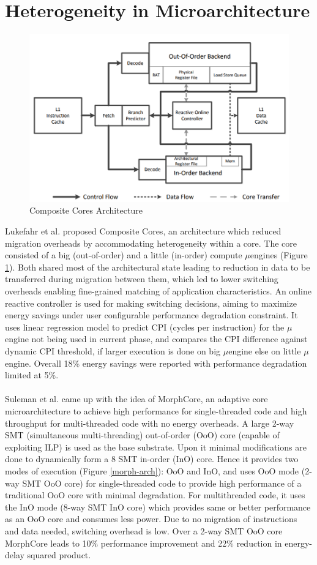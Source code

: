 \documentclass[a4paper,12pt, final]{report}
\begin{document}
\section{Heterogeneity in Microarchitecture}
\begin{figure}[H]
    \centering
    \includegraphics[width=0.65\linewidth]{composite-cores-arch.png}
    \caption{Composite Cores Architecture}
    \label{composite-arch}
\end{figure}
Lukefahr et al. \cite{lukefahr2012composite} proposed Composite Cores, an architecture which reduced migration overheads by accommodating heterogeneity within a core. The core consisted of a big (out-of-order) and a little (in-order) compute $\mu$engines (Figure \ref{composite-arch}). Both shared most of the architectural state leading to reduction in data to be transferred during migration between them, which led to lower switching overheads enabling fine-grained matching of application characteristics. An online reactive controller is used for making switching decisions, aiming to maximize energy savings under user configurable performance degradation constraint. It uses linear regression model to predict CPI (cycles per instruction) for the $\mu$engine not being used in current phase, and compares the CPI difference against dynamic CPI threshold, if larger execution is done on big $\mu$engine else on little $\mu$engine. Overall 18\% energy savings were reported with performance degradation limited at 5\%. \\\\
\indent Suleman et al. \cite{suleman2012morphcore} came up with the idea of MorphCore, an adaptive core microarchitecture to achieve high performance for single-threaded code and high throughput for multi-threaded code with no energy overheads. A large 2-way SMT (simultaneous multi-threading) out-of-order (OoO) core (capable of exploiting ILP) is used as the base substrate. Upon it minimal modifications are done to dynamically form a 8 SMT in-order (InO) core. Hence it provides two modes of execution (Figure \ref{morph-arch}): OoO and InO, and uses OoO mode (2-way SMT OoO core) for single-threaded code to provide high performance of a traditional OoO core with minimal degradation. For multithreaded code, it uses the InO mode (8-way SMT InO core) which provides same or better performance as an OoO core \cite{hily1999} and consumes less power. Due to no migration of instructions and data needed, switching overhead is low. Over a 2-way SMT OoO core MorphCore leads to 10\% performance improvement and 22\% reduction in energy-delay squared product. 
\end{document}
